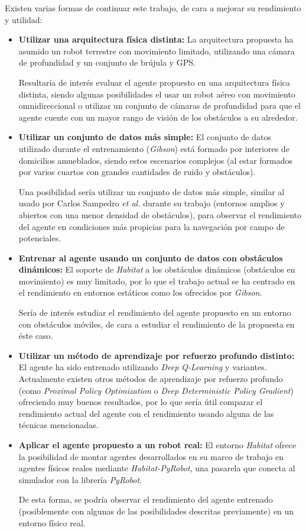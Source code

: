 Existen varias formas de continuar este trabajo, de cara a mejorar su rendimiento y utilidad:
\begin{itemize}
	\item \textbf{Utilizar una arquitectura física distinta:} La arquitectura propuesta ha asumido un robot terrestre con movimiento limitado, utilizando una cámara de profundidad y un conjunto de brújula y GPS.
	
	Resultaría de interés evaluar el agente propuesto en una arquitectura física distinta, siendo algunas posibilidades el usar un robot aéreo con movimiento omnidireccional o utilizar un conjunto de cámaras de profundidad para que el agente cuente con un mayor rango de visión de los obstáculos a su alrededor.
	\item \textbf{Utilizar un conjunto de datos más simple:} El conjunto de datos utilizado durante el entrenamiento (\textit{Gibson}) está formado por interiores de domicilios amueblados, siendo estos escenarios complejos (al estar formados por varios cuartos con grandes cantidades de ruido y obstáculos).
	
	Una posibilidad sería utilizar un conjunto de datos más simple, similar al usado por Carlos Sampedro \textit{et al.} \cite{Sampedro2018} durante su trabajo (entornos amplios y abiertos con una menor densidad de obstáculos), para observar el rendimiento del agente en condiciones más propicias para la navegación por campo de potenciales.
	
	\item \textbf{Entrenar al agente usando un conjunto de datos con obstáculos dinámicos:} El soporte de \textit{Habitat} a los obstáculos dinámicos (obstáculos en movimiento) es muy limitado, por lo que el trabajo actual se ha centrado en el rendimiento en entornos estáticos como los ofrecidos por \textit{Gibson}.
	
	Sería de interés estudiar el rendimiento del agente propuesto en un entorno con obstáculos móviles, de cara a estudiar el rendimiento de la propuesta en éste caso.
	
	\item \textbf{Utilizar un método de aprendizaje por refuerzo profundo distinto:} El agente ha sido entrenado utilizando \textit{Deep Q-Learning} y variantes. Actualmente existen otros métodos de aprendizaje por refuerzo profundo (como \textit{Proximal Policy Optimization} o \textit{Deep Deterministic Policy Gradient}) ofreciendo muy buenos resultados, por lo que sería útil comparar el rendimiento actual del agente con el rendimiento usando alguna de las técnicas mencionadas.
	
	\item \textbf{Aplicar el agente propuesto a un robot real:} El entorno \textit{Habitat} ofrece la posibilidad de montar agentes desarrollados en su marco de trabajo en agentes físicos reales mediante \textit{Habitat-PyRobot}, una pasarela que conecta al simulador con la librería \textit{PyRobot}.
	
	De esta forma, se podría observar el rendimiento del agente entrenado (posiblemente con algunas de las posibilidades descritas previamente) en un entorno físico real.
\end{itemize}